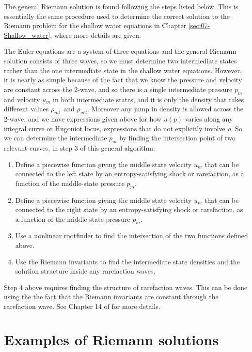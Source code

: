 \documentclass{SIAMbook2016}
\providecommand{\tightlist}{%
      \setlength{\itemsep}{0pt}\setlength{\parskip}{0pt}}
\begin{document}
The general Riemann solution is found following the steps listed below.
This is essentially the same procedure used to determine the correct
solution to the Riemann problem for the shallow water equations in
Chapter \ref{sec:07-Shallow_water}, where more details are given.

The Euler equations are a system of three equations and the general
Riemann solution consists of three waves, so we must determine two
intermediate states rather than the one intermediate state in the
shallow water equations. However, it is nearly as simple because of the
fact that we know the pressure and velocity are constant across the
2-wave, and so there is a single intermediate pressure \(p_m\) and
velocity \(u_m\) in both intermediate states, and it is only the density
that takes different values \(\rho_{m1}\) and \(\rho_{m2}\). Moreover
any jump in density is allowed across the 2-wave, and we have
expressions given above for how \(u(p)\) varies along any integral curve
or Hugoniot locus, expressions that do not explicitly involve \(\rho\).
So we can determine the intermediate \(p_m\) by finding the intersection
point of two relevant curves, in step 3 of this general algorithm:

\begin{enumerate}
\def\labelenumi{\arabic{enumi}.}
\tightlist
\item
  Define a piecewise function giving the middle state velocity \(u_m\)
  that can be connected to the left state by an entropy-satisfying shock
  or rarefaction, as a function of the middle-state pressure \(p_m\).
\item
  Define a piecewise function giving the middle state velocity \(u_m\)
  that can be connected to the right state by an entropy-satisfying
  shock or rarefaction, as a function of the middle-state pressure
  \(p_m\).
\item
  Use a nonlinear rootfinder to find the intersection of the two
  functions defined above.
\item
  Use the Riemann invariants to find the intermediate state densities
  and the solution structure inside any rarefaction waves.
\end{enumerate}

Step 4 above requires finding the structure of rarefaction waves. This
can be done using the the fact that the Riemann invariants are constant
through the rarefaction wave. See Chapter 14 of \cite{fvmhp} for more
details.

\hypertarget{examples-of-riemann-solutions}{%
\section{Examples of Riemann
solutions}\label{examples-of-riemann-solutions}}
\end{document}
